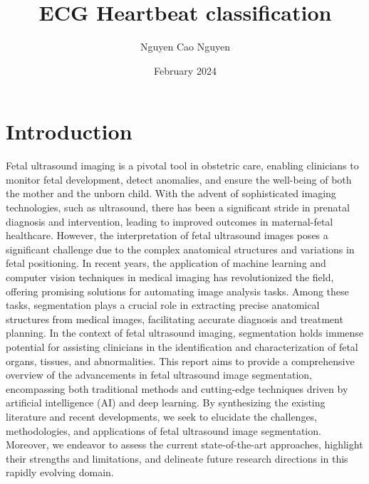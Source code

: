 \documentclass[hidelinks]{report}
\title{ECG Heartbeat classification}
\author{Nguyen Cao Nguyen}
\date{February 2024}
\begin{document}
\maketitle

\chapter{Introduction}
Fetal ultrasound imaging is a pivotal tool in obstetric care, enabling clinicians to monitor fetal development, detect anomalies, and ensure the well-being of both the mother and the unborn child. With the advent of sophisticated imaging technologies, such as ultrasound, there has been a significant stride in prenatal diagnosis and intervention, leading to improved outcomes in maternal-fetal healthcare. However, the interpretation of fetal ultrasound images poses a significant challenge due to the complex anatomical structures and variations in fetal positioning.
In recent years, the application of machine learning and computer vision techniques in medical imaging has revolutionized the field, offering promising solutions for automating image analysis tasks. Among these tasks, segmentation plays a crucial role in extracting precise anatomical structures from medical images, facilitating accurate diagnosis and treatment planning. In the context of fetal ultrasound imaging, segmentation holds immense potential for assisting clinicians in the identification and characterization of fetal organs, tissues, and abnormalities.
This report aims to provide a comprehensive overview of the advancements in fetal ultrasound image segmentation, encompassing both traditional methods and cutting-edge techniques driven by artificial intelligence (AI) and deep learning. By synthesizing the existing literature and recent developments, we seek to elucidate the challenges, methodologies, and applications of fetal ultrasound image segmentation. Moreover, we endeavor to assess the current state-of-the-art approaches, highlight their strengths and limitations, and delineate future research directions in this rapidly evolving domain.
\end{document}
